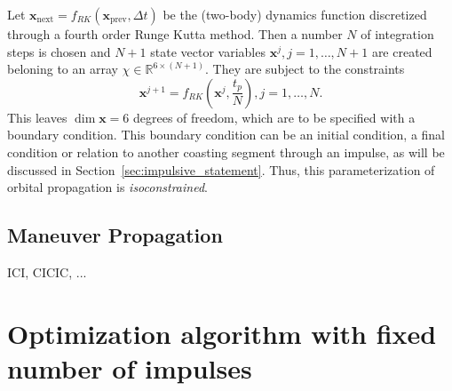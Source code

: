 Let \(\mathbf{x}_{\text{next}} = f_{RK}(\mathbf{x}_{\text{prev}}, \Delta t)\) be the (two-body) dynamics function discretized through a fourth order Runge Kutta method. Then a number \(N\) of integration steps is chosen and \(N+1\) state vector variables \(\mathbf{x}^j, j=1,\dots,N+1\) are created beloning to an array \(\chi \in \mathbb{R}^{6 \times (N+1)}\). They are subject to the constraints
\begin{equation}
    \mathbf{x}^{j+1} = f_{RK}(\mathbf{x}^j, \frac{t_p}{N}), j = 1, \dots, N.
\end{equation}
This leaves \(\dim \mathbf{x} = 6\) degrees of freedom, which are to be specified with a boundary condition. This boundary condition can be an initial condition, a final condition or relation to another coasting segment through an impulse, as will be discussed in Section~\ref{sec:impulsive_statement}. Thus, this parameterization of orbital propagation is \textit{isoconstrained}.

\subsection{Maneuver Propagation}

ICI, CICIC, ...



\section{Optimization algorithm with fixed number of impulses}


